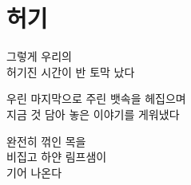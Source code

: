\hypertarget{uxd5c8uxae30}{%

\chapter{허기}\label{uxd5c8uxae30}}



그렇게 우리의\\

허기진 시간이 반 토막 났다



우린 마지막으로 주린 뱃속을 헤집으며\\

지금 것 담아 놓은 이야기를 게워냈다



완전히 꺾인 목을\\

비집고 하얀 림프샘이\\

기어 나온다

